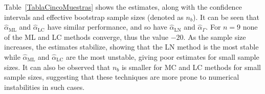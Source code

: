 \documentclass[twocolumn]{svjour3}
\begin{document}
Table~\ref{TablaCincoMuestras} shows the estimates, along with the confidence intervals and effective bootstrap sample sizes (denoted as $n_b$).
It can be seen that $\widehat{\alpha}_{\text{{ML}}}$ and $\widehat{\alpha}_{\text{{LC}}}$ have similar performance, and so have $\widehat{\alpha}_{\text{{LN}}}$ and $\widehat{\alpha}_{\Gamma}$. 
For $n= 9$ none of the ML and LC methods converge, thus the value $-20$. 
As the sample size increases, the estimates stabilize, showing that the LN method is the most stable while $\widehat{\alpha}_{\text{{ML}}}$ and $\widehat{\alpha}_{\text{{LC}}}$ are the most unstable, giving poor estimates for small sample sizes.
It can also be observed that $n_b$ is smaller for MC and LC methods for small sample sizes, suggesting that these techniques are more prone to numerical instabilities in such cases.


\end{document}
